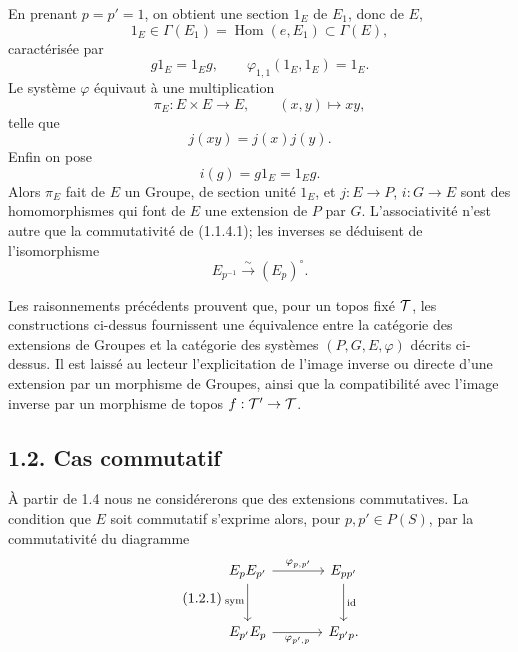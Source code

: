 \documentclass[11pt]{article}
\providecommand{\id}{\operatorname{id}}
\begin{document}
En prenant \(p=p'=1\), on obtient une section \(1_E\) de \(E_1\), donc de \(E\),
\begin{equation}\tag{1.1.5.5}
  1_E\in\Gamma(E_1)=\operatorname{Hom}(e,E_1)\subset\Gamma(E),
\end{equation}
caractérisée par
\[
  g1_E=1_Eg,\qquad \varphi_{1,1}(1_E,1_E)=1_E.
\]
Le système \(\varphi\) équivaut à une multiplication
\begin{equation}\tag{1.1.5.7}
  \pi_E:E\times E\longrightarrow E,\qquad (x,y)\longmapsto xy,
\end{equation}
telle que
\begin{equation}\tag{1.1.5.8}
  j(xy)=j(x)j(y).
\end{equation}
Enfin on pose
\begin{equation}\tag{1.1.5.9}
  i(g)=g1_E=1_Eg.
\end{equation}
Alors \(\pi_E\) fait de \(E\) un Groupe, de section unité \(1_E\), et \(j:E\to P\), \(i:G\to E\) sont des homomorphismes qui font de \(E\) une extension de \(P\) par \(G\).  L'associativité n'est autre que la commutativité de (1.1.4.1); les inverses se déduisent de l'isomorphisme
\begin{equation}\tag{1.1.5.10}
  E_{p^{-1}}\xrightarrow{\sim}(E_p)^\circ.
\end{equation}

Les raisonnements précédents prouvent que, pour un topos fixé \(\mathcal T\), les constructions ci-dessus fournissent une équivalence entre la catégorie des extensions de Groupes et la catégorie des systèmes \((P,G,E,\varphi)\) décrits ci-dessus.  Il est laissé au lecteur l'explicitation de l'image inverse ou directe d'une extension par un morphisme de Groupes, ainsi que la compatibilité avec l'image inverse par un morphisme de topos \(f:\mathcal T'\to\mathcal T\).

\subsection*{1.2. Cas commutatif}

À partir de 1.4 nous ne considérerons que des extensions commutatives.  La condition que \(E\) soit commutatif s'exprime alors, pour \(p,p'\in P(S)\), par la commutativité du diagramme
\begin{equation}\tag{1.2.1}
\begin{tikzcd}[column sep=large,row sep=large]
E_pE_{p'}\arrow[r,"\varphi_{p,p'}"]\arrow[d,"\sym"']&
E_{pp'}\arrow[d,"\id"]\\
E_{p'}E_p\arrow[r,"\varphi_{p',p}"']&
E_{p'p}.
\end{tikzcd}
\end{equation}
\end{document}

